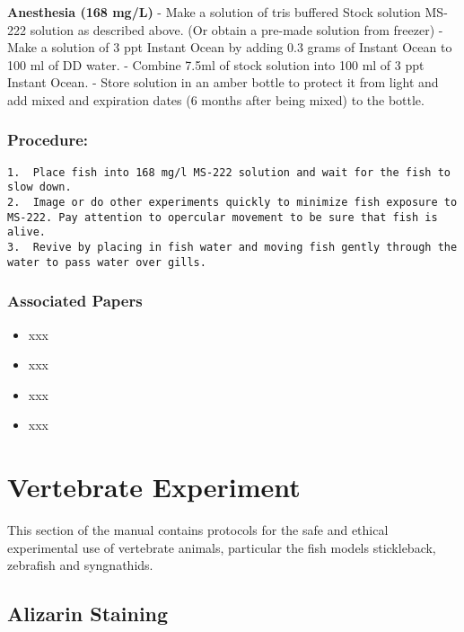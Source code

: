 \documentclass[
  letterpaper,
  DIV=11,
  numbers=noendperiod]{scrreprt}
\providecommand{\tightlist}{%
  \setlength{\itemsep}{0pt}\setlength{\parskip}{0pt}}\usepackage{longtable,booktabs,array}
\begin{document}
\textbf{Anesthesia (168 mg/L)} - Make a solution of tris buffered Stock
solution MS-222 solution as described above. (Or obtain a pre-made
solution from freezer) - Make a solution of 3 ppt Instant Ocean by
adding 0.3 grams of Instant Ocean to 100 ml of DD water. - Combine 7.5ml
of stock solution into 100 ml of 3 ppt Instant Ocean. - Store solution
in an amber bottle to protect it from light and add mixed and expiration
dates (6 months after being mixed) to the bottle.

\hypertarget{procedure-37}{%
\section{Procedure:}\label{procedure-37}}

\begin{verbatim}
1.  Place fish into 168 mg/l MS-222 solution and wait for the fish to slow down.
2.  Image or do other experiments quickly to minimize fish exposure to MS-222. Pay attention to opercular movement to be sure that fish is alive.
3.  Revive by placing in fish water and moving fish gently through the water to pass water over gills.
\end{verbatim}

\hypertarget{associated-papers-22}{%
\section{Associated Papers}\label{associated-papers-22}}

\begin{itemize}
\tightlist
\item
  xxx
\item
  xxx
\item
  xxx
\item
  xxx
\end{itemize}

\part{Vertebrate Experiment}

This section of the manual contains protocols for the safe and ethical
experimental use of vertebrate animals, particular the fish models
stickleback, zebrafish and syngnathids.

\hypertarget{sec-xxx-xxx}{%
\chapter{Alizarin Staining}\label{sec-xxx-xxx}}
\end{document}
